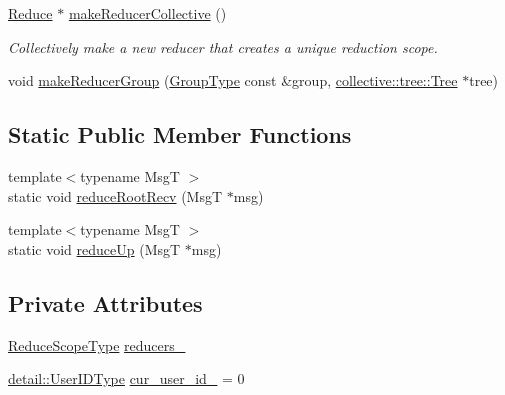 \begin{DoxyCompactItemize}
\item 
\hyperlink{structvt_1_1collective_1_1reduce_1_1_reduce}{Reduce} $\ast$ \hyperlink{structvt_1_1collective_1_1reduce_1_1_reduce_manager_a4b81ceab5d9f081f393dd68cece25935}{make\+Reducer\+Collective} ()
\begin{DoxyCompactList}\small\item\em Collectively make a new reducer that creates a unique reduction scope. \end{DoxyCompactList}\item 
void \hyperlink{structvt_1_1collective_1_1reduce_1_1_reduce_manager_a44fa84680d3b310f4cb3f6c776a31751}{make\+Reducer\+Group} (\hyperlink{namespacevt_a27b5e4411c9b6140c49100e050e2f743}{Group\+Type} const \&group, \hyperlink{structvt_1_1collective_1_1tree_1_1_tree}{collective\+::tree\+::\+Tree} $\ast$tree)
\end{DoxyCompactItemize}
\subsection*{Static Public Member Functions}
\begin{DoxyCompactItemize}
\item 
{\footnotesize template$<$typename MsgT $>$ }\\static void \hyperlink{structvt_1_1collective_1_1reduce_1_1_reduce_manager_a7ee21e635c585acc7d7339911a0900eb}{reduce\+Root\+Recv} (MsgT $\ast$msg)
\item 
{\footnotesize template$<$typename MsgT $>$ }\\static void \hyperlink{structvt_1_1collective_1_1reduce_1_1_reduce_manager_a744a70b8e28ef9c58cb9ccdb06493d15}{reduce\+Up} (MsgT $\ast$msg)
\end{DoxyCompactItemize}
\subsection*{Private Attributes}
\begin{DoxyCompactItemize}
\item 
\hyperlink{structvt_1_1collective_1_1reduce_1_1_reduce_manager_a2c340e5d3b12e4f2df64b9c1502445cf}{Reduce\+Scope\+Type} \hyperlink{structvt_1_1collective_1_1reduce_1_1_reduce_manager_a8226dde1ab69b8332db65f558f405ad5}{reducers\+\_\+}
\item 
\hyperlink{namespacevt_1_1collective_1_1reduce_1_1detail_ae82d7b96b0885b9b7dfb0104398beead}{detail\+::\+User\+I\+D\+Type} \hyperlink{structvt_1_1collective_1_1reduce_1_1_reduce_manager_a716c66493c02898d5ac8c2b8ca62efd0}{cur\+\_\+user\+\_\+id\+\_\+} = 0
\end{DoxyCompactItemize}


